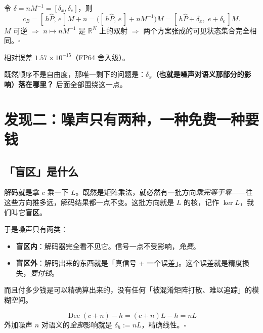 \documentclass[UTF8, fontset=macnew, 11pt]{ctexart}
\newcommand{\kerL}{\ker L}
\newcommand{\Ph}{\hat P}
\begin{document}
\begin{mathbox}[定理 1：共轭等价]
令 $\delta=nM^{-1}=[\delta_x,\delta_e]$，则
$$c_B=[\,h\Ph,\,e\,]M+n=\bigl([\,h\Ph,\,e\,]+nM^{-1}\bigr)M=[\,h\Ph+\delta_x,\;e+\delta_e\,]M.$$
$M$ 可逆 $\Rightarrow$ $n\mapsto nM^{-1}$ 是 $\mathbb R^N$ 上的双射 $\Rightarrow$ 两个方案张成的可见状态集合完全相同。$\square$
\end{mathbox}

\begin{numbox}
相对误差 $1.57\times10^{-15}$（FP64 舍入级）。
\end{numbox}

\begin{warnbox}[这一条把问题改写了]
既然顺序不是自由度，那唯一剩下的问题是：\textbf{$\delta_x$（也就是噪声对语义那部分的影响）落在哪里？} 后面全部围绕这一点。
\end{warnbox}

\section{发现二：噪声只有两种，一种免费一种要钱}

\subsection{「盲区」是什么}

\begin{plainbox}
解码就是拿 $c$ 乘一下 $L$。既然是矩阵乘法，就必然有一批方向\emph{乘完等于零}——往这些方向推多远，解码结果都一点不变。这批方向就是 $L$ 的核，记作 $\kerL$，我们叫它\textbf{盲区}。

于是噪声只有两类：
\begin{itemize}
  \item \textbf{盲区内}：解码器完全看不见它。信号一点不受影响，\emph{免费}。
  \item \textbf{盲区外}：解码出来的东西就是「真信号 + 一个误差」。这个误差就是精度损失，\emph{要付钱}。
\end{itemize}

而且付多少钱是可以精确算出来的，没有任何「被混淆矩阵打散、难以追踪」的模糊空间。
\end{plainbox}

\begin{mathbox}[定理 2：语义误差恒等式]
$$\boxed{\;\operatorname{Dec}(c+n)-h=(c+n)L-h=nL\;}$$
外加噪声 $n$ 对语义的\emph{全部}影响就是 $\delta_h:=nL$，精确线性。$\square$
\end{mathbox}
\end{document}
